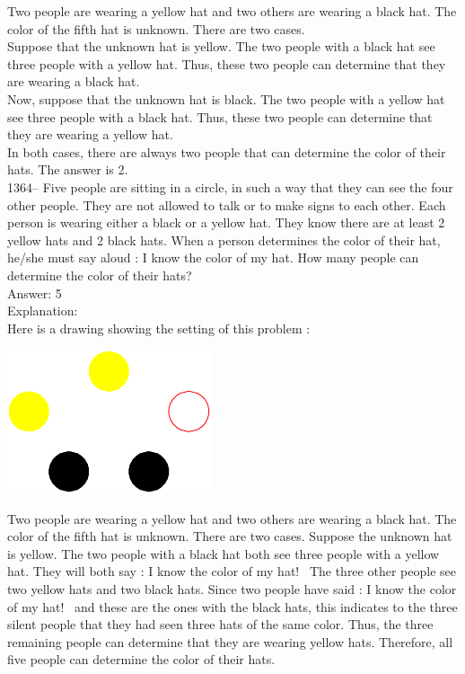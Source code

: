 \documentclass[letterpaper, 12pt]{article}
\begin{document}
Two people are wearing a yellow hat and two others are wearing a black hat. The color of the fifth hat is unknown. There are two cases.\\

Suppose that the unknown hat is yellow. The two people with a black hat see three people with a yellow hat. Thus, these two people can determine that they are wearing a black hat.\\

Now, suppose that the unknown hat is black. The two people with a yellow hat see three people with a black hat. Thus, these two people can determine that they are wearing a yellow hat.\\

In both cases, there are always two people that can determine the color of their hats. The answer is 2.\\

1364-- Five people are sitting in a circle, in such a way that they can see the four other people. They are not allowed to talk or to make signs to each other. Each person is wearing either a black or a yellow hat. They know there are at least 2 yellow hats and 2 black hats. When a person determines the color of their hat, he/she must say aloud : \og I know the color of my hat\fg. How many people can determine the color of their hats?\\

Answer: 5\\

Explanation: \\
Here is a drawing showing the setting of this problem :
    \begin{center}
    \includegraphics[width=6cm,bb=0 0 400 400]{chapeaux.eps}
    \end{center}

Two people are wearing a yellow hat and two others are wearing a black hat. The color of the fifth hat is unknown. There are two cases. Suppose the unknown hat is yellow. The two people with a black hat both see three people with a yellow hat. They will both say : \og I know the color of my hat! \fg\ The three other people see two yellow hats and two black hats. Since two people have said : \og I know the color of my hat! \fg\ and these are the ones with the black hats, this indicates to the three silent people that they had seen three hats of the same color. Thus, the three remaining people can determine that they are wearing yellow hats. Therefore, all five people can determine the color of their hats.\\
\end{document}
